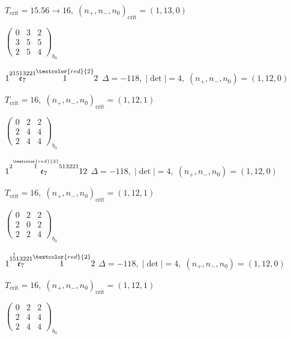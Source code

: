 \documentclass[10pt]{article}
\begin{document}
\hspace{1em}$T_{\text{crit}}=15.56 \to 16,\; (n_+,n_-,n_0)_{\text{crit}}=(1,13,0)$

\hspace{2em}$\left(\begin{smallmatrix}0 & 3 & 2 \\ 3 & 5 & 5 \\ 2 & 5 & 4\end{smallmatrix}\right)_{\!b_0}$

\smallskip

$1\overset{21513221}{\mathfrak{e}_7}\overset{\textcolor{red}{2}}{1}2$ \quad $\Delta=-118,\; |\det|=4,\; (n_+,n_-,n_0)=(1,12,0)$

\hspace{1em}$T_{\text{crit}}=16,\; (n_+,n_-,n_0)_{\text{crit}}=(1,12,1)$

\hspace{2em}$\left(\begin{smallmatrix}0 & 2 & 2 \\ 2 & 4 & 4 \\ 2 & 4 & 4\end{smallmatrix}\right)_{\!b_0}$

$1\overset{2\overset{\textcolor{red}{2}}{1}513221}{\mathfrak{e}_7}12$ \quad $\Delta=-118,\; |\det|=4,\; (n_+,n_-,n_0)=(1,12,0)$

\hspace{1em}$T_{\text{crit}}=16,\; (n_+,n_-,n_0)_{\text{crit}}=(1,12,1)$

\hspace{2em}$\left(\begin{smallmatrix}0 & 2 & 2 \\ 2 & 0 & 2 \\ 2 & 2 & 4\end{smallmatrix}\right)_{\!b_0}$

\smallskip

$1\overset{1\overset{1}{5}13221}{\mathfrak{e}_7}\overset{\textcolor{red}{2}}{1}2$ \quad $\Delta=-118,\; |\det|=4,\; (n_+,n_-,n_0)=(1,12,0)$

\hspace{1em}$T_{\text{crit}}=16,\; (n_+,n_-,n_0)_{\text{crit}}=(1,12,1)$

\hspace{2em}$\left(\begin{smallmatrix}0 & 2 & 2 \\ 2 & 4 & 4 \\ 2 & 4 & 4\end{smallmatrix}\right)_{\!b_0}$
\end{document}
